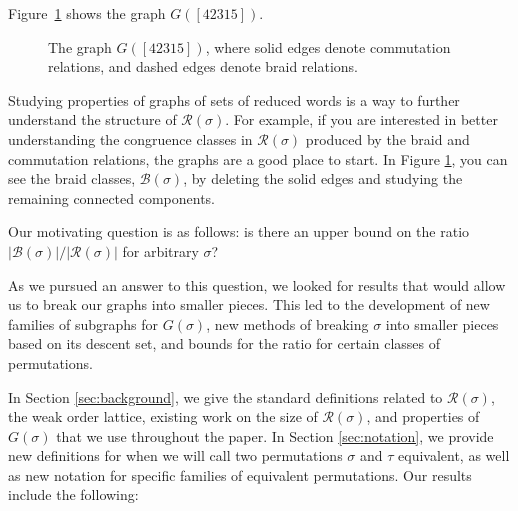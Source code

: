 \documentclass[11pt,reqno]{amsart}
\theoremstyle{definition}
\theoremstyle{notation}
\newcommand{\calR}{\mathcal{R}}
\newcommand{\calB}{\mathcal{B}}
\begin{document}
Figure~\ref{fig:graphofsigma} shows the graph $G([42315])$. 

\begin{figure}[H]
\begin{center}
\vspace{0.1in}
\caption{The graph $G([42315])$, where solid edges denote commutation relations, and dashed edges denote braid relations.}
\label{fig:graphofsigma}
\end{center}
\end{figure}

Studying properties of graphs of sets of reduced words is a way to further understand the structure of $\calR(\sigma)$. For example, if you are interested in better understanding the congruence classes in $\calR(\sigma)$ produced by the braid and commutation relations, the graphs are a good place to start. In Figure \ref{fig:graphofsigma}, you can see the braid classes, $\calB(\sigma)$, by deleting the solid edges and studying the remaining connected components.

Our motivating question is as follows: is there an upper bound on the ratio $|\calB(\sigma)|/|\calR(\sigma)|$ for arbitrary $\sigma$? 

As we pursued an answer to this question, we looked for results that would allow us to break our graphs into smaller pieces. This led to the development of new families of subgraphs for $G(\sigma)$, new methods of breaking $\sigma$ into smaller pieces based on its descent set, and bounds for the ratio for certain classes of permutations. 

In Section \ref{sec:background}, we give the standard definitions related to $\calR(\sigma)$, the weak order lattice, existing work on the size of $\calR(\sigma)$, and properties of $G(\sigma)$ that we use throughout the paper. In Section \ref{sec:notation}, we provide new definitions for when we will call two permutations $\sigma$ and $\tau$ equivalent, as well as new notation for specific families of equivalent permutations. Our results include the following:
\end{document}
